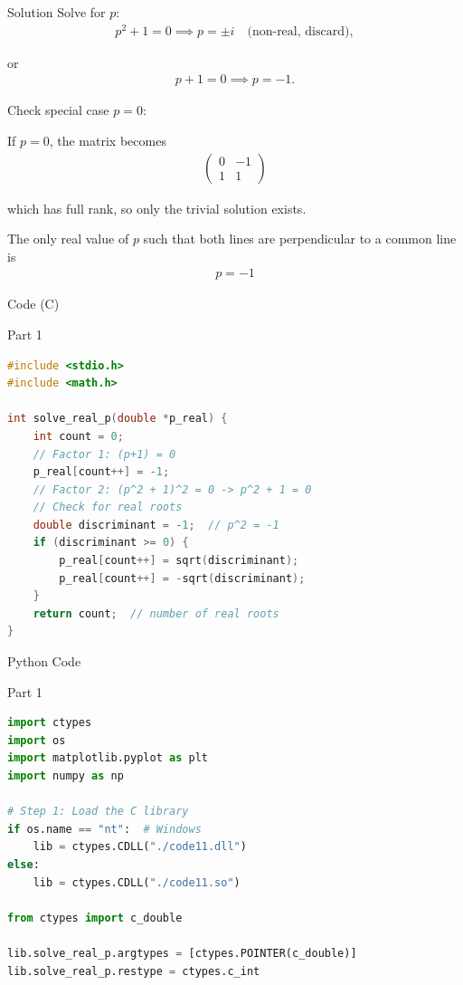 \documentclass{beamer}
\begin{document}
\begin{frame}{Solution}
 Solve for $p$:
\begin{align}
p^2 + 1 = 0 \implies p = \pm i \quad \text{(non-real, discard)},
\end{align}

or
\begin{align}
p + 1 = 0 \implies p = -1.
\end{align}

 Check special case $p = 0$:

If $p = 0$, the matrix becomes
\begin{align}
\begin{pmatrix}
0 & -1 \\
1 & 1
\end{pmatrix}
\end{align}

which has full rank, so only the trivial solution exists.

 The only real value of $p$ such that both lines are perpendicular to a common line is
\begin{align}
\boxed{p = -1}
\end{align}




\end{frame}


\begin{frame}[fragile]{ Code (C)}
\begin{block}{Part 1}
\begin{lstlisting}[language=C, basicstyle=\ttfamily\small, keywordstyle=\color{blue}, frame=single]
#include <stdio.h>
#include <math.h>

int solve_real_p(double *p_real) {
    int count = 0;
    // Factor 1: (p+1) = 0
    p_real[count++] = -1;
    // Factor 2: (p^2 + 1)^2 = 0 -> p^2 + 1 = 0
    // Check for real roots
    double discriminant = -1;  // p^2 = -1
    if (discriminant >= 0) {
        p_real[count++] = sqrt(discriminant);
        p_real[count++] = -sqrt(discriminant);
    }
    return count;  // number of real roots
}
\end{lstlisting}
\end{block}
\end{frame}


\begin{frame}[fragile]{Python Code}
\begin{block}{Part 1}
\begin{lstlisting}[language=Python, basicstyle=\ttfamily\small, keywordstyle=\color{blue}, frame=single]
import ctypes
import os
import matplotlib.pyplot as plt
import numpy as np

# Step 1: Load the C library
if os.name == "nt":  # Windows
    lib = ctypes.CDLL("./code11.dll")
else:
    lib = ctypes.CDLL("./code11.so")

from ctypes import c_double

lib.solve_real_p.argtypes = [ctypes.POINTER(c_double)]
lib.solve_real_p.restype = ctypes.c_int
\end{lstlisting}
\end{block}
\end{frame}
\end{document}
